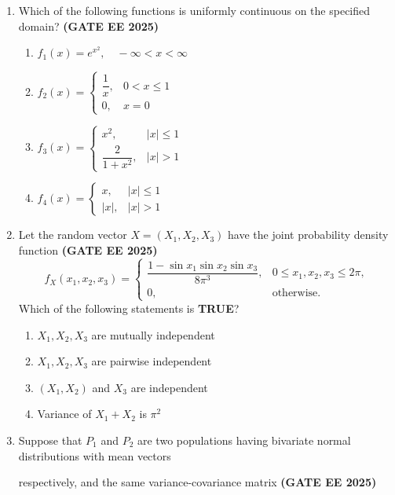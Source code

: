 \documentclass[journal,12pt,onecolumn]{IEEEtran}
\theoremstyle{remark}
\begin{document}
\begin{enumerate}
\item Which of the following functions is uniformly continuous on the specified domain?
\hfill \textbf{(GATE EE 2025)}
\begin{enumerate}
\item $f_1(x) = e^{x^2}, \quad -\infty < x < \infty$
\item 
$f_2(x) = \begin{cases}
\dfrac{1}{x}, & 0 < x \leq 1 \\
0, & x=0
\end{cases}$
\item 
$f_3(x) = \begin{cases}
x^2, & |x| \leq 1 \\
\dfrac{2}{1+x^2}, & |x| > 1
\end{cases}$
\item 
$f_4(x) = \begin{cases}
x, & |x| \leq 1 \\
|x|, & |x| > 1
\end{cases}$
\end{enumerate}

\item Let the random vector $X = (X_1, X_2, X_3)$ have the joint probability density function \hfill \textbf{(GATE EE 2025)}
\[
f_X(x_1, x_2, x_3) = 
\begin{cases}
\dfrac{1 - \sin x_1 \sin x_2 \sin x_3}{8\pi^3}, & 0 \leq x_1, x_2, x_3 \leq 2\pi, \\
0, & \text{otherwise}.
\end{cases}
\]
Which of the following statements is \textbf{TRUE}?
\begin{enumerate}
\item $X_1, X_2, X_3$ are mutually independent
\item $X_1, X_2, X_3$ are pairwise independent
\item $(X_1, X_2)$ and $X_3$ are independent
\item Variance of $X_1 + X_2$ is $\pi^2$
\end{enumerate}

\item Suppose that $P_{1}$ and $P_{2}$ are two populations having bivariate normal 
distributions with mean vectors  
\quad {} \quad
{}

respectively, and the same variance-covariance matrix \hfill \textbf{(GATE EE 2025)}



\end{enumerate}
\end{document}
